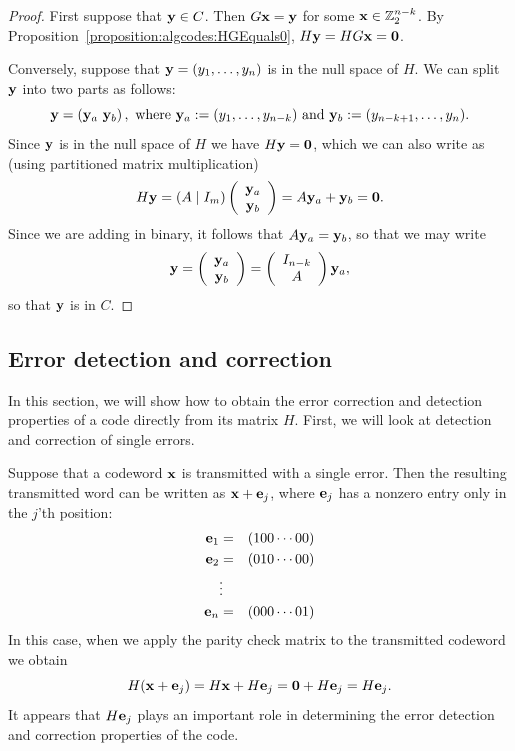  
\begin{proof}
First suppose that ${\bold y} \in C$. Then $G {\bold x} = {\bold y}$
for some ${\bold x} \in \mathbb{Z}_2^{n-k}$. By Proposition~\ref{proposition:algcodes:HGEquals0}, $H {\bold y} = HG
{\bold x} = {\bold 0}$. 
 
 
Conversely, suppose that ${\bold y} = (y_1, \ldots, y_n)$ is
in the null space of $H$. We can split ${\bold y}$ into two parts as follows:
\[{\bold y} =  \left(  {\bold y}_a \,\, {\bold y}_b
 \right), \text{ where } {\bold y}_a := (y_1, \ldots, y_{n-k}) \text{ and } {\bold y}_b := (y_{n-k+1}, \ldots, y_n). \]
Since  ${\bold y}$ is in the null space of $H$ we have 
 $H
{\bold y} = {\bold 0}$, which we can also write as (using partitioned matrix multiplication)
\[ H {\bold y} = ( A \mid I_m) \left(
 \begin{array}{c}
 {\bold y}_a \\
{\bold y}_b
 \end{array} \right) = A {\bold y}_a + {\bold y}_b = {\bold 0}.
 \]
Since we are adding in binary, it follows that $A {\bold y}_a = {\bold y}_b$, so that we may write
\[ 
 {\bold y} = \left(
 \begin{array}{c}
 {\bold y}_a \\
{\bold y}_b
 \end{array} \right)
 = \left(
 \begin{array}{c}
 I_{n-k} \\
A
 \end{array} \right) 
 {\bold y}_a,
 \]
so that ${\bold y}$ is in $C$.
\end{proof}
 
 \subsection{Error detection and correction}
 
In this section, we will show how to  obtain the error correction and detection properties of a code directly from its matrix $H$. First, we will look at detection and correction of single errors.

Suppose that a codeword ${\bold x}$ is transmitted with a single error. Then the resulting transmitted word can be written as ${\bold x} + {\bold e}_j$, where ${\bold e}_j$ has a nonzero entry only in the $j$'th position:
\begin{eqnarray*}
{\bold e}_1 & = & (100 \cdots 00) \\
{\bold e}_2 & = & (010 \cdots 00) \\
 & \vdots & \\
{\bold e}_n & = & (000 \cdots 01)
\end{eqnarray*}
In this case, when we apply the parity check matrix to the transmitted codeword we obtain
\[ H({\bold x} + {\bold e}_j) = H{\bold x} + H{\bold e}_j = {\bold 0} + H{\bold e}_j  = H{\bold e}_j. \]
It appears that $H{\bold e}_j$ plays an important role in determining the error detection and correction properties of the code.

